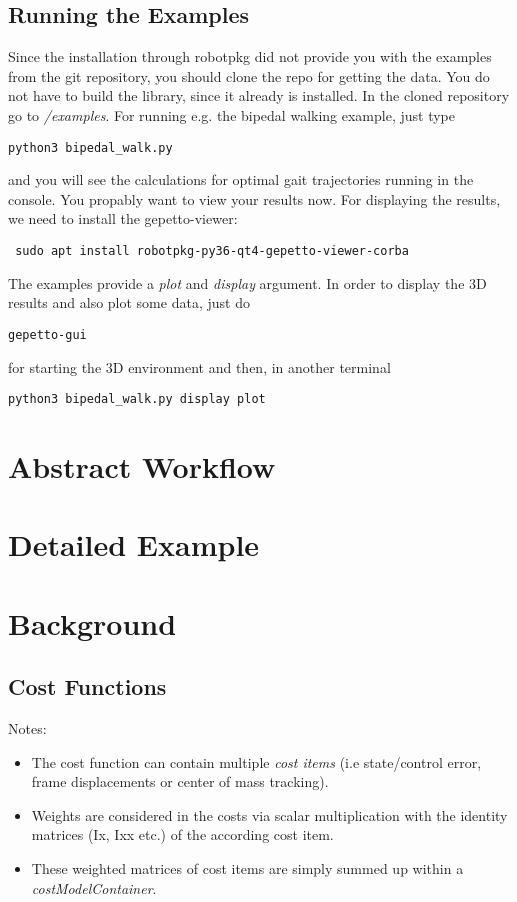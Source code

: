 \subsection{Running the Examples}
Since the installation through robotpkg did not provide you with the examples from the git repository, you should clone the repo \cite{crocoddylweb} for getting the data. You do not have to build the library, since it already is installed. 
In the cloned repository go to \textit{/examples}. For running e.g. the bipedal walking example, just type
\begin{verbatim}
python3 bipedal_walk.py
\end{verbatim}
and you will see the calculations for optimal gait trajectories running in the console. 
You propably want to view your results now. For displaying the results, we need to install the gepetto-viewer:
\begin{verbatim}
 sudo apt install robotpkg-py36-qt4-gepetto-viewer-corba
\end{verbatim}
The examples provide a \textit{plot} and \textit{display} argument. In order to display the 3D results and also plot some data, just do 
\begin{verbatim}
gepetto-gui
\end{verbatim}
for starting the 3D environment and then, in another terminal
\begin{verbatim}
python3 bipedal_walk.py display plot
\end{verbatim}




\section{Abstract Workflow}


\section{Detailed Example}


\section{Background}
\subsection{Cost Functions}
Notes:
\begin{itemize}
\item The cost function can contain multiple \textit{cost items} (i.e state/control error, frame displacements or center of mass tracking).
\item Weights are considered in the costs via scalar multiplication with the identity matrices (Ix, Ixx etc.) of the according cost item. 
\item These weighted matrices of cost items are simply summed up within a \textit{costModelContainer}.


\end{itemize}


